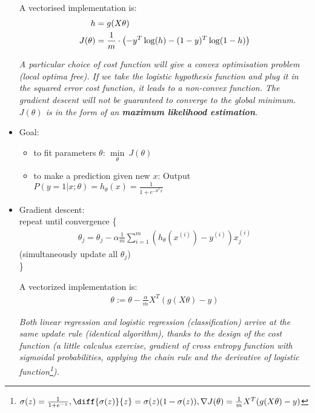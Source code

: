 \begin{itemize}
    A vectorised implementation is:
    \begin{align} 
       h &= g(X\theta)\newline \\
       J(\theta) &= \frac{1}{m} \cdot \left(-y^{T}\log(h)-(1-y)^{T}\log(1-h)\right)
    \end{align}
    
    \emph{\textcolor{Bittersweet}{A particular choice of cost function will give a convex optimisation problem (local optima free). If we take the logistic hypothesis function and plug it in the squared error cost function, it leads to a non-convex function. The gradient descent will not be guaranteed to converge to the global minimum. $J(\theta)$ is in the form of an \textbf{maximum likelihood estimation}.}}
    
\item
    Goal: 
    \begin{itemize}
    \item to fit parameters $\theta$: $\underset{\theta}{\min} \ J(\theta)$\\
    \item to make a prediction given new $x$: Output $P(y=1|x;\theta) = h_{\theta}(x)=\frac{1}{1+e^{-\theta^Tx}}$
    \end{itemize}
    
\item
    Gradient descent:\\
	repeat until convergence \{ \\
	\begin{equation}
	\begin{split}
	\theta_j  = \theta_j - \alpha \frac{1}{m} \sum_{i=1}^m (h_\theta(x^{(i)}) - y^{(i)}) x_j^{(i)}
	\end{split}
	\end{equation}
	(simultaneously update all $\theta_j$)\\
	\}
	
    A vectorized implementation is:
    \begin{align}
    \theta := \theta - \frac{\alpha}{m}X^T(g(X\theta)-y)
    \end{align}
    
    \emph{\textcolor{Bittersweet}{Both linear regression and logistic regression (classification) arrive at the same update rule (identical algorithm), thanks to the design of the cost function (a little calculus exercise, gradient of cross entropy function with sigmoidal probabilities, applying the chain rule and the derivative of logistic function\footnote{$\sigma(z)=\frac{1}{1+e^{-z}}, \diff{\sigma(z)}{z}=\sigma(z)(1-\sigma(z)), \nabla{J(\theta)} = \frac{1}{m}X^T(g(X\theta) - y)$}).}}

\end{itemize}

